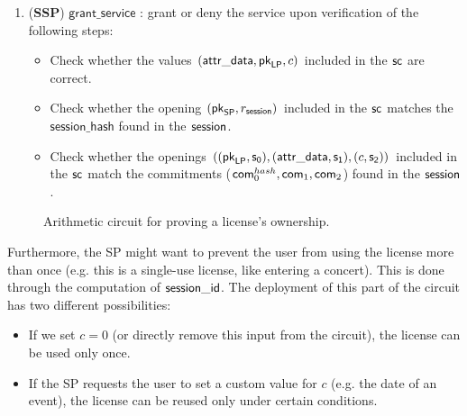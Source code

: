 \begin{enumerate}
	\item (\textbf{SSP}) $\mathsf{grant\_service}$ : grant or deny the service upon verification of the following steps:

	\begin{itemize}
		\item Check whether the values $(\mathsf{attr\_data}, \mathsf{pk}_{\mathsf{LP}}, c)$ included in the $\mathsf{sc}$ are correct.
		\item Check whether the opening $(\mathsf{pk}_{\mathsf{SP}}, r_\mathsf{session})$ included in the $\mathsf{sc}$ matches the $\mathsf{session\_hash}$ found in the $\mathsf{session}$.
		\item Check whether the openings $((\mathsf{pk}_{\mathsf{LP}}, \mathsf{s_0}), (\mathsf{attr\_data}, \mathsf{s_1}), (c, \mathsf{s_2}))$ included in the $\mathsf{sc}$ match the commitments ($\mathsf{com}_0^{hash}, \mathsf{com}_1, \mathsf{com}_2$) found in the $\mathsf{session}$.
	\end{itemize}

\end{enumerate}

\begin{figure}[h]
	\centering
	\setlength{\fboxsep}{5pt}%
	\setlength{\fboxrule}{0.3pt}%
	\caption{Arithmetic circuit for proving a license's ownership.}
	\label{fig:circuit_prove_nft}
\end{figure}

Furthermore, the SP might want to prevent the user from using the license more than once (e.g. this is a single-use license, like entering a concert). This is done through the computation of $\mathsf{session\_id}$. The deployment of this part of the circuit has two different possibilities:
\begin{itemize}
	\item If we set $c = 0$ (or directly remove this input from the circuit), the license can be used only once.
	\item If the SP requests the user to set a custom value for $c$ (e.g. the date of an event), the license can be reused only under certain conditions.
\end{itemize}
